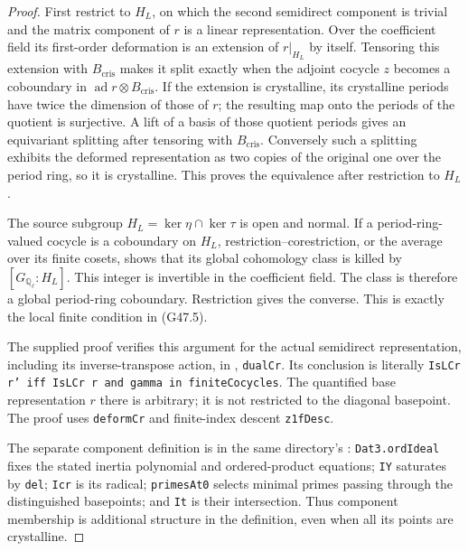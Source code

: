 \begin{proof}
First restrict to $H_L$, on which the second semidirect
component is trivial and the matrix component of $r$ is a
linear representation.  Over the coefficient field its
first-order deformation is an extension of $r|_{H_L}$ by
itself.  Tensoring this extension with
$B_{\mathrm{cris}}$ makes it split exactly when the adjoint
cocycle $z$ becomes a coboundary in
$\operatorname{ad}r\otimes B_{\mathrm{cris}}$.
If the extension is crystalline, its crystalline periods have
twice the dimension of those of $r$; the resulting map onto
the periods of the quotient is surjective.  A lift of a basis
of those quotient periods gives an equivariant splitting after
tensoring with $B_{\mathrm{cris}}$.  Conversely such a splitting
exhibits the deformed representation as two copies of the
original one over the period ring, so it is crystalline.
This proves the equivalence after restriction to $H_L$.

The source subgroup $H_L=\ker\eta\cap\ker\tau$ is open
and normal.  If a period-ring-valued cocycle is a coboundary
on $H_L$, restriction--corestriction, or the average over its
finite cosets, shows that its global cohomology class is killed
by $[G_{\mathbb Q_\ell}:H_L]$.  This integer is invertible
in the coefficient field.  The class is therefore a global
period-ring coboundary.  Restriction gives the converse.
This is exactly the local finite condition in (G47.5).

The supplied proof verifies this argument for the actual
semidirect representation, including its inverse-transpose
action, in
,
\texttt{dualCr}.  Its conclusion is literally
\texttt{IsLCr r' iff IsLCr r and gamma in finiteCocycles}.
The quantified base representation $r$ there is arbitrary;
it is not restricted to the diagonal basepoint.
The proof uses \texttt{deformCr} and finite-index descent
\texttt{z1fDesc}.

The separate component definition is in the same directory's
:
\texttt{Dat3.ordIdeal} fixes the stated inertia polynomial
and ordered-product equations;
\texttt{IY} saturates by \texttt{del};
\texttt{Icr} is its radical;
\texttt{primesAt0} selects minimal primes passing through
the distinguished basepoints; and
\texttt{It} is their intersection.
Thus component membership is additional structure in the
definition, even when all its points are crystalline.


\end{proof}
